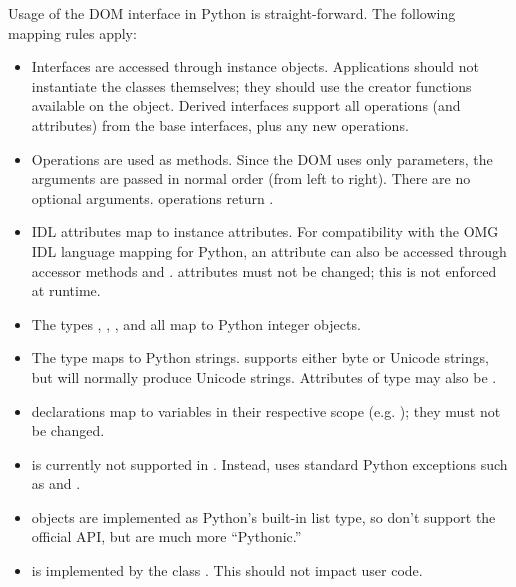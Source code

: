 Usage of the DOM interface in Python is straight-forward.  The
following mapping rules apply:

\begin{itemize}
\item Interfaces are accessed through instance objects. Applications
      should not instantiate the classes themselves; they should use
      the creator functions available on the  object.
      Derived interfaces support all operations (and attributes) from
      the base interfaces, plus any new operations.

\item Operations are used as methods. Since the DOM uses only
       parameters, the arguments are passed in normal
      order (from left to right).   There are no optional
      arguments.  operations return .

\item IDL attributes map to instance attributes. For compatibility
      with the OMG IDL language mapping for Python, an attribute
       can also be accessed through accessor methods
       and .  
      attributes must not be changed; this is not enforced at
      runtime.

\item The types , , , and  all map to Python integer
      objects.

\item The type  maps to Python strings.
       supports either byte or Unicode
      strings, but will normally produce Unicode strings.  Attributes
      of type  may also be .

\item {} declarations map to variables in their
      respective scope
      (e.g. );
      they must not be changed.

\item {} is currently not supported in
      .  Instead,
       uses standard Python exceptions such
      as  and .

\item {} objects are implemented as Python's built-in
      list type, so don't support the official API, but are much more
      ``Pythonic.''

\item {} is implemented by the class
      .  This should not impact user code.
\end{itemize}


